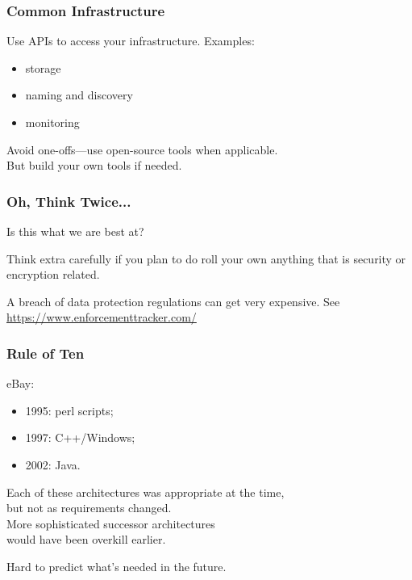 \begin{frame}
\frametitle{Common Infrastructure}

\large
\begin{changemargin}{1cm}
Use APIs to access your infrastructure. Examples:

\begin{itemize}
\item storage
\item naming and discovery
\item monitoring
\end{itemize}

Avoid one-offs---use open-source tools when applicable.\\
But build your own tools if needed.
\end{changemargin}

\end{frame}

\begin{frame}
\frametitle{Oh, Think Twice...}

Is this what we are best at?

Think extra carefully if you plan to do roll your own anything that is security or encryption related.

A breach of data protection regulations can get very expensive. See \url{https://www.enforcementtracker.com/}

\end{frame}



\begin{frame}
\frametitle{Rule of Ten}

\large
\begin{changemargin}{1cm}
eBay:
\begin{itemize}
\item 1995: perl scripts;
\item 1997: C++/Windows;
\item 2002: Java.
\end{itemize}

Each of these architectures was appropriate at the time, \\
but not as requirements changed. \\[1em]

More sophisticated successor architectures \\
would have been overkill earlier.

Hard to predict what's needed in the future.
\end{changemargin}

\end{frame}



